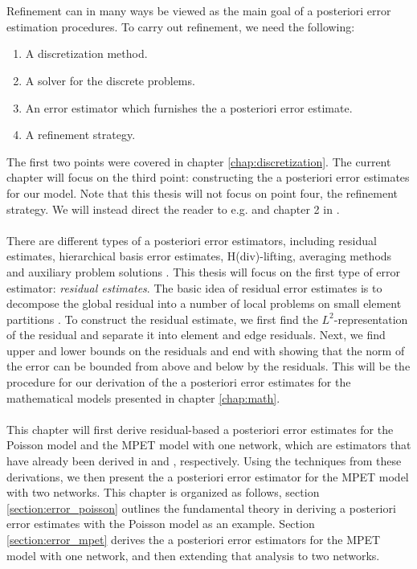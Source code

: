 \\
\\
Refinement can in many ways be viewed as the main goal of a posteriori error estimation procedures. To carry out refinement, we need the following:
\begin{enumerate}[noitemsep]
\item A discretization method.
\item A solver for the discrete problems.
\item An error estimator which furnishes the a posteriori error estimate. 
\item A refinement strategy.
\end{enumerate}
The first two points were covered in chapter \ref{chap:discretization}. The current chapter will focus on the third point: constructing the a posteriori error estimates for our model. Note that this thesis will not focus on point four, the refinement strategy. We will instead direct the reader to e.g. \cite{mitchell, eriksson} and chapter 2 in \cite{verfurth13}. 
\\
\\
There are different types of a posteriori error estimators, including residual estimates, hierarchical basis error estimates, H(div)-lifting, averaging methods and auxiliary problem solutions \cite{verfurth13}. This thesis will focus on the first type of error estimator: \textit{residual estimates}. The basic idea of residual error estimates is to decompose the global residual into a number of local problems on small element partitions \cite{babuska78a}. To construct the residual estimate, we first find the $L^2$-representation of the residual and separate it into element and edge residuals. Next, we find upper and lower bounds on the residuals and end with showing that the norm of the error can be bounded from above and below by the residuals. This will be the procedure for our derivation of the a posteriori error estimates for the mathematical models presented in chapter \ref{chap:math}. 
\\
\\
This chapter will first derive residual-based a posteriori error estimates for the Poisson model and the MPET model with one network, which are estimators that have already been derived in \cite{verfurth96} and \cite{meunier}, respectively. Using the techniques from these derivations, we then present the a posteriori error estimator for the MPET model with two networks. This chapter is organized as follows, section \ref{section:error_poisson} outlines the fundamental theory in deriving a posteriori error estimates with the Poisson model as an example. Section \ref{section:error_mpet} derives the a posteriori error estimators for the MPET model with one network, and then extending that analysis to two networks. 

